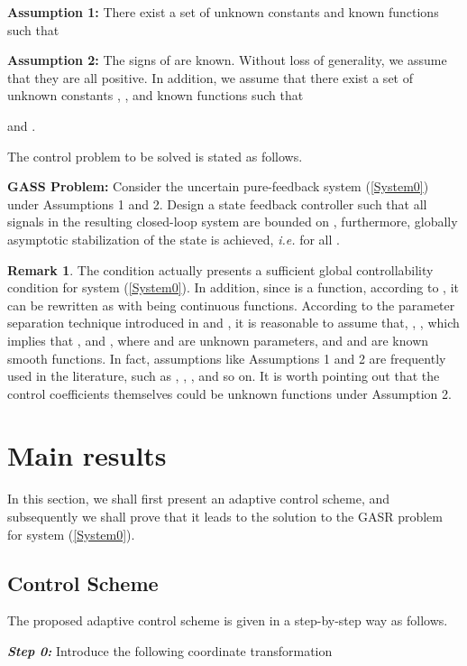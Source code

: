 \documentclass{tSYS2e}
\theoremstyle{plain}
\theoremstyle{definition}
\newtheorem{remark}{Remark}
\begin{document}
\textbf{Assumption 1:} There exist a set of unknown constants  and known  functions  such that

\textbf{Assumption 2:} The signs of  are known.
Without loss of generality, we assume that they are all positive. In addition,
we assume that there exist a set of unknown constants , , and
known  functions  such that

and .

The control problem to be solved is stated as follows.

\textbf{GASS Problem:} Consider the
uncertain pure-feedback system (\ref{System0}) under Assumptions 1 and 2.
Design a  state feedback controller  such that all signals in
the resulting closed-loop system are bounded on , furthermore,
globally asymptotic stabilization of the state  is achieved, \emph{i.e.}  for all .

\begin{remark}
The condition  actually presents a sufficient global
controllability condition for system (\ref{System0}).
In addition, since  is a  function,
according to \cite{Nijmeijer1990}, it can be rewritten as  with  being continuous functions. According to the parameter separation
technique introduced in \cite{Lin2002a} and \cite{Lin2002b}, it is reasonable to assume that,
, , which implies that
, and
, where  and 
are unknown parameters, and  and 
are known smooth functions. In fact, assumptions like Assumptions 1 and 2 are frequently
used in the literature, such as \cite{Lin2002a}, \cite{Lin2002b}, \cite{Sun2007}, and so on.
It is worth pointing out that the control coefficients  themselves could be unknown functions under Assumption 2.
\end{remark}

\section{Main results}

In this section, we shall first present an adaptive control scheme, and
subsequently we shall prove that it leads to the solution to the GASR
problem for system (\ref{System0}).

\subsection{Control Scheme}

The proposed adaptive control scheme is given in a step-by-step way as
follows.

\textbf{\emph{Step 0:}} Introduce the following coordinate transformation
\end{document}
